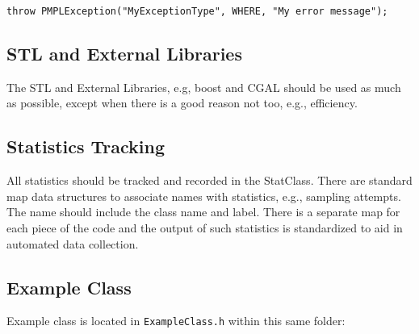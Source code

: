 \documentclass[12pt]{article}
\newcommand{\EXCISE}[1]{}
\begin{document}
\begin{lstlisting}
throw PMPLException("MyExceptionType", WHERE, "My error message");
\end{lstlisting}

\subsection{STL and External Libraries}

The STL and External Libraries, e.g, boost and CGAL should be used as much as
possible, except when there is a good reason not too, e.g., efficiency.

\subsection{Statistics Tracking}

All statistics should be tracked and recorded in the StatClass. There are
standard map data structures to associate names with statistics, e.g., sampling
attempts. The name should include the class name and label. There is a separate
map for each piece of the code and the output of such statistics is standardized
to aid in automated data collection.

\subsection{Example Class}
Example class is located in \texttt{ExampleClass.h} within this same folder:




\EXCISE{

\section{Documentation}
All documentation should be done with DOxygen. DOxygen standards used within PMPL are not decided upon yet.

\section{Testing}
Currently only nightly compilation testing occurs nightly. This should be expanded in the future.

}
\end{document}
